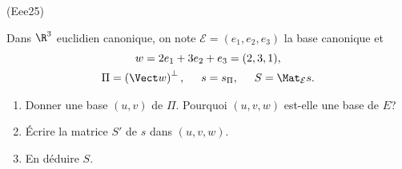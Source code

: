 \begin{tiny}(Eee25)\end{tiny} Dans $\R^3$ euclidien canonique, on note $\mathcal{E}=(e_1,e_2,e_3)$ la base canonique et 
\begin{multline*}
 w = 2e_1 + 3e_2 +e_3 = (2,3,1),\\
 \Pi = \left( \Vect w\right)^{\bot}, \hspace{0.5cm}
 s = s_{\Pi}, \hspace{0.5cm} S =\Mat_{\mathcal{E}}{s}. 
\end{multline*}

\begin{enumerate}
 \item Donner une base $(u,v)$ de $\Pi$. Pourquoi $(u,v,w)$ est-elle une base de $E$?
 \item \'Ecrire la matrice $S'$ de $s$ dans $(u,v,w)$.
 \item En déduire $S$.
\end{enumerate}
